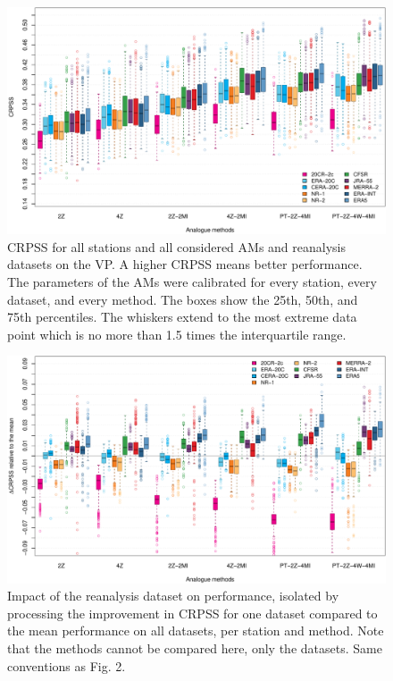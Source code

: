 \documentclass[alpha-refs]{wiley-article}
\begin{document}
\begin{figure}[bt]
	\centering
	\includegraphics[width=\textwidth]{figures/boxplot-per-method.pdf}
	\caption{CRPSS for all stations and all considered AMs and reanalysis datasets on the VP. A higher CRPSS means better performance. The parameters of the AMs were calibrated for every station, every dataset, and every method. The boxes show the 25th, 50th, and 75th percentiles. The whiskers extend to the most extreme data point which is no more than 1.5 times the interquartile range.}
	\label{fig:comparison_values}
\end{figure}

\begin{figure}[bt]
	\centering
	\includegraphics[width=\textwidth]{figures/boxplot-per-method-diff.pdf}
	\caption{Impact of the reanalysis dataset on performance, isolated by processing the improvement in CRPSS for one dataset compared to the mean performance on all datasets, per station and method. Note that the methods cannot be compared here, only the datasets. Same conventions as Fig. 2.}
	\label{fig:comparison_relative}
\end{figure}
\end{document}
